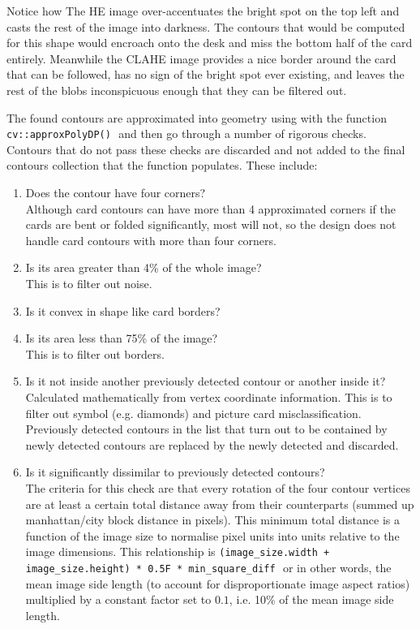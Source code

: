 \documentclass[a4paper,12pt,notitlepage]{article}
\newcommand{\code}[1]{\colorbox{white}{\lstinline[basicstyle=\ttfamily\color{black}]|#1|} }
\begin{document}
			Notice how The HE image over-accentuates the bright spot on the top left and casts the rest of the image into darkness. The contours that would be computed for this shape would encroach onto the desk and miss the bottom half of the card entirely. Meanwhile the CLAHE image provides a nice border around the card that can be followed, has no sign of the bright spot ever existing, and leaves the rest of the blobs inconspicuous enough that they can be filtered out.

			The found contours are approximated into geometry using with the function \code{cv::approxPolyDP()} and then go through a number of rigorous checks. Contours that do not pass these checks are discarded and not added to the final contours collection that the function populates. These include:

			\begin{enumerate}
				\item Does the contour have four corners?\\[4px]
					Although card contours can have more than 4 approximated corners if the cards are bent or folded significantly, most will not, so the design does not handle card contours with more than four corners.
				\item Is its area greater than 4\% of the whole image?\\[4px]
					This is to filter out noise.
				\item Is it convex in shape like card borders?
				\item Is its area less than 75\% of the image?\\[4px]
					This is to filter out borders.
				\item Is it not inside another previously detected contour or another inside it?\\[4px]
					Calculated mathematically from vertex coordinate information. This is to filter out symbol (e.g. diamonds) and picture card misclassification. Previously detected contours in the list that turn out to be contained by newly detected contours are replaced by the newly detected and discarded.
				\item Is it significantly dissimilar to previously detected contours?\\[4px]
					The criteria for this check are that every rotation of the four contour vertices are at least a certain total distance away from their counterparts (summed up manhattan/city block distance in pixels). This minimum total distance is a function of the image size to normalise pixel units into units relative to the image dimensions. This relationship is \code{(image_size.width + image_size.height) * 0.5F * min_square_diff} or in other words, the mean image side length (to account for disproportionate image aspect ratios) multiplied by a constant factor set to $0.1$, i.e. 10\% of the mean image side length.
			\end{enumerate}
\end{document}
